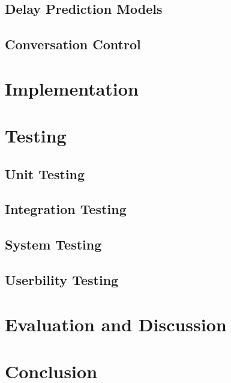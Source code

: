 \documentclass[11pt]{article}
\begin{document}
\subsection{Delay Prediction Models} \label{delay-prediction}

\subsection{Conversation Control} \label{conversation-control}

%

\section{Implementation} \label{implementation}

\section{Testing} \label{testing}

\subsection{Unit Testing} \label{unit-testing}

\subsection{Integration Testing} \label{integration-testing}

\subsection{System Testing} \label{system-testing}

\subsection{Userbility Testing} \label{usability-testing}


\section{Evaluation and Discussion} \label{evaluation-discussion}

\section{Conclusion} \label{conclusion}


%
 
\end{document}
